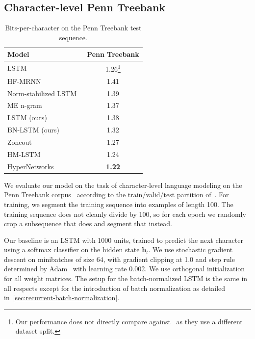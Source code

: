 \documentclass{article} %
\newcommand{\vect}[1]{\mathbf{#1}}
\begin{document}
\subsection{Character-level Penn Treebank}
\begin{table}%
  \center
\begin{tabular}{@{}lc@{}}
  \toprule
  \bf Model & \bf Penn Treebank \\
  \midrule
  LSTM~\citep{graves2013generating} &  1.26\footnote{Our performance does not directly compare against~\citet{graves2013generating} as they use a different dataset split.}\\
  \midrule
  HF-MRNN~\citep{mikolov2012subword} & 1.41 \\
  Norm-stabilized LSTM~\citep{krueger} & 1.39 \\
  ME n-gram~\citep{mikolov2012subword} & 1.37 \\
  \midrule
  LSTM (ours) & 1.38 \\
  BN-LSTM (ours) & 1.32 \\
  \midrule
  Zoneout~\citep{krueger2016zoneout} & 1.27 \\
  HM-LSTM~\citep{chung2016hierarchical} & 1.24 \\
  HyperNetworks~\citep{ha2016hypernetworks} & \textbf{1.22} \\
  \bottomrule
\end{tabular}
\caption{Bits-per-character on the Penn Treebank test sequence.}
\label{tab:ptb_test}
\end{table}

We evaluate our model on the task of character-level language modeling on the
Penn Treebank corpus~\citep{penntreebank} according to the train/valid/test
partition of~\citet{mikolov2012subword}.  For training, we segment the training
sequence into examples of length 100.  The training sequence does not cleanly
divide by 100, so for each epoch we randomly crop a subsequence that does and
segment that instead.

Our baseline is an LSTM with 1000 units, trained to predict the next character
using a softmax classifier on the hidden state $\vect{h}_t$.  We use stochastic
gradient descent on minibatches of size 64, with gradient clipping at 1.0 and
step rule determined by Adam~\citep{kingma2014adam} with learning rate 0.002.
We use orthogonal initialization for all weight matrices.  The setup for the
batch-normalized LSTM is the same in all respects except for the introduction
of batch normalization as detailed in~\ref{sec:recurrent-batch-normalization}.
\end{document}

